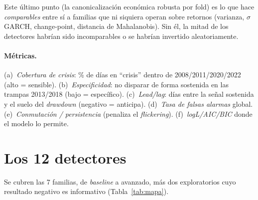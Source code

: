 \documentclass[11pt,a4paper]{article}
\begin{document}
\noindent Este \'ultimo punto (la canonicalizaci\'on econ\'omica robusta por fold) es lo
que hace \emph{comparables} entre s\'i a familias que ni siquiera operan sobre retornos
(varianza, $\sigma$ GARCH, change-point, distancia de Mahalanobis). Sin \'el, la mitad de
los detectores habr\'ian sido incomparables o se habr\'ian invertido aleatoriamente.

\paragraph{M\'etricas.} (a)~\emph{Cobertura de crisis}: \% de d\'ias en ``crisis'' dentro
de 2008/2011/2020/2022 (alto = sensible). (b)~\emph{Especificidad}: no disparar de forma
sostenida en las trampas 2013/2018 (bajo = espec\'ifico). (c)~\emph{Lead/lag}: d\'ias entre
la se\~nal sostenida y el suelo del \emph{drawdown} (negativo = anticipa). (d)~\emph{Tasa de
falsas alarmas} global. (e)~\emph{Conmutaci\'on / persistencia} (penaliza el
\emph{flickering}). (f)~\emph{logL/AIC/BIC} donde el modelo lo permite.

\section{Los 12 detectores}

Se cubren las 7 familias, de \emph{baseline} a avanzado, m\'as dos exploratorios cuyo
resultado negativo es informativo (Tabla~\ref{tab:mapa}).
\end{document}
